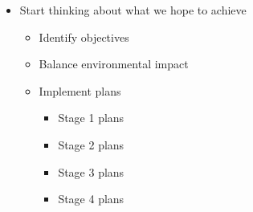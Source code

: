 \documentclass{article}
\begin{document}
	\begin{itemize}
		\item Start thinking about what we hope to achieve
		\begin{itemize}
			\item[$\bullet$] Identify objectives
			\item[$\circ$] Balance environmental impact 
			\item[$\square$] Implement plans
			\begin{itemize}
				\item[$\diamond$] Stage 1 plans
				\item[$\star$] Stage 2 plans
				\item[$\triangle$] Stage 3 plans
				\item[$\blacksquare$] Stage 4 plans
			\end{itemize}
		\end{itemize}
	\end{itemize}
	
\end{document}
